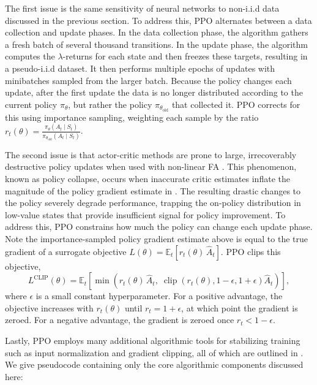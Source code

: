 The first issue is the same sensitivity of neural networks to non-i.i.d data discussed in the previous section. To address this, PPO alternates between a data collection and update phases. In the data collection phase, the algorithm gathers a fresh batch of several thousand transitions. In the update phase, the algorithm computes the $\lambda$-returns for each state and then freezes these targets, resulting in a pseudo-i.i.d dataset. It then performs multiple epochs of updates with minibatches sampled from the larger batch. Because the policy changes each update, after the first update the data is no longer distributed according to the current policy $\pi_\theta$, but rather the policy $\pi_{\theta_{\text{old}}}$ that collected it. PPO corrects for this using importance sampling, weighting each sample by the ratio $r_t(\theta) = \frac{\pi_\theta(A_t \mid S_t)}{\pi_{\theta_{\text{old}}}(A_t \mid S_t)}$.

The second issue is that actor-critic methods are prone to large, irrecoverably destructive policy updates when used with non-linear FA . This phenomenon, known as policy collapse, occurs when inaccurate critic estimates inflate the magnitude of the policy gradient estimate in . The resulting drastic changes to the policy severely degrade performance, trapping the on-policy distribution in low-value states that provide insufficient signal for policy improvement. To address this, PPO constrains how much the policy can change each update phase. Note the importance-sampled policy gradient estimate above is equal to the true gradient of a surrogate objective $L(\theta) = \mathbb{E}_t\!\left[ r_t(\theta)\, \hat{A}_t \right]$. PPO clips this objective,
\begin{equation}
L^{\text{CLIP}}(\theta) = \mathbb{E}_t\!\left[ \min\!\left( r_t(\theta)\,\hat{A}_t,\; \operatorname{clip}\!\left(r_t(\theta), 1-\epsilon, 1+\epsilon\right)\hat{A}_t \right) \right],
\end{equation}
where $\epsilon$ is a small constant hyperparameter. For a positive advantage, the objective increases with $r_t(\theta)$ until $r_t = 1+\epsilon$, at which point the gradient is zeroed. For a negative advantage, the gradient is zeroed once $r_t < 1-\epsilon$.

Lastly, PPO employs many additional algorithmic tools for stabilizing training such as input normalization and gradient clipping, all of which are outlined in . We give pseudocode containing only the core algorithmic components discussed here:


